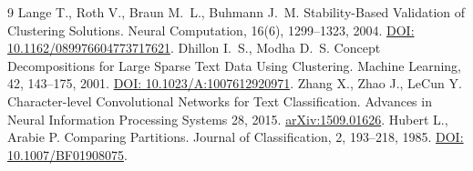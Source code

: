 \documentclass{misisarticle}
\begin{document}
\begin{thebibliography}{9}
 Lange T., Roth V., Braun M.~L., Buhmann J.~M. Stability-Based Validation of Clustering Solutions. Neural Computation, 16(6), 1299--1323, 2004. \href{https://doi.org/10.1162/089976604773717621}{DOI: 10.1162/089976604773717621}.
 Dhillon I.~S., Modha D.~S. Concept Decompositions for Large Sparse Text Data Using Clustering. Machine Learning, 42, 143--175, 2001. \href{https://doi.org/10.1023/A:1007612920971}{DOI: 10.1023/A:1007612920971}.
 Zhang X., Zhao J., LeCun Y. Character-level Convolutional Networks for Text Classification. Advances in Neural Information Processing Systems 28, 2015. \href{https://arxiv.org/abs/1509.01626}{arXiv:1509.01626}.
 Hubert L., Arabie P. Comparing Partitions. Journal of Classification, 2, 193--218, 1985. \href{https://doi.org/10.1007/BF01908075}{DOI: 10.1007/BF01908075}.
\end{thebibliography}
\end{document}
